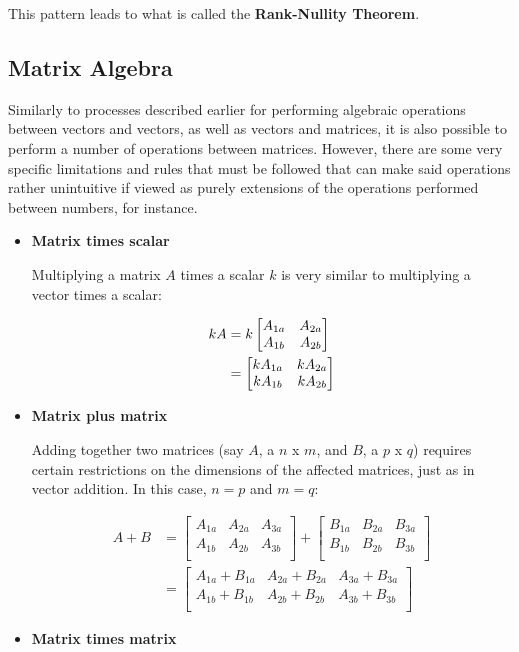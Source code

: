 \documentclass[12pt]{article}
\begin{document}
This pattern leads to what is called the \textbf{Rank-Nullity Theorem}.

\subsection{Matrix Algebra}

Similarly to processes described earlier for performing algebraic operations between vectors and vectors, as well as vectors and matrices, it is also possible to perform a number of operations between matrices. However, there are some very specific limitations and rules that must be followed that can make said operations rather unintuitive if viewed as purely extensions of the operations performed between numbers, for instance.

\begin{itemize}
    \item \textbf{Matrix times scalar}
    
    Multiplying a matrix $A$ times a scalar $k$ is very similar to multiplying a vector times a scalar:
    
    \begin{equation}
        \begin{split}
            kA &= k\begin{bmatrix} A_{1a} &A_{2a}\\ A_{1b} &A_{2b}\\ \end{bmatrix}\\
            &= \begin{bmatrix} k A_{1a} &k A_{2a}\\ k A_{1b} &k A_{2b}\\ \end{bmatrix}\\
        \end{split}
    \end{equation}
    
    \item \textbf{Matrix plus matrix}
    
    Adding together two matrices (say $A$, a $n$ x $m$, and $B$, a $p$ x $q$) requires certain restrictions on the dimensions of the affected matrices, just as in vector addition. In this case, $n=p$ and $m=q$:
    
    \begin{equation}
        \begin{split}
            A + B &= \begin{bmatrix}
            A_{1a} & A_{2a} & A_{3a}\\
            A_{1b} & A_{2b} & A_{3b}\\
            \end{bmatrix} + \begin{bmatrix}
            B_{1a} & B_{2a} & B_{3a}\\
            B_{1b} & B_{2b} & B_{3b}\\
            \end{bmatrix}\\
            &= \begin{bmatrix}
            A_{1a}+B_{1a} & A_{2a}+B_{2a} & A_{3a}+B_{3a}\\
            A_{1b}+B_{1b} & A_{2b}+B_{2b} & A_{3b}+B_{3b}\\
            \end{bmatrix}
        \end{split}
    \end{equation}
    \item \textbf{Matrix times matrix}
    

\end{itemize}
\end{document}
